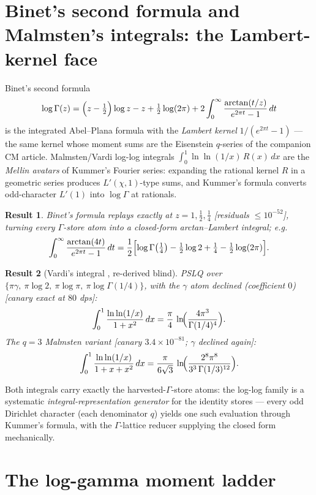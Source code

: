 \documentclass[11pt]{article}
\newtheorem{result}{Result}[section]
\theoremstyle{remark}
\newcommand{\dps}[1]{\textsf{\footnotesize[#1]}}
\begin{document}
\section{Binet's second formula and Malmsten's integrals: the Lambert-kernel face}
\label{sec:binet}

Binet's second formula
\[
\log\Gamma(z)=\Bigl(z-\tfrac12\Bigr)\log z-z+\tfrac12\log(2\pi)
+2\int_0^\infty\frac{\arctan(t/z)}{e^{2\pi t}-1}\,dt
\]
is the integrated Abel--Plana formula with the \emph{Lambert kernel} $1/(e^{2\pi t}-1)$ ---
the same kernel whose moment sums are the Eisenstein $q$-series of the companion CM
article. Malmsten/Vardi log-log integrals $\int_0^1\ln\ln(1/x)\,R(x)\,dx$ are the
\emph{Mellin avatars} of Kummer's Fourier series: expanding the rational kernel $R$ in a
geometric series produces $L'(\chi,1)$-type sums, and Kummer's formula converts
odd-character $L'(1)$ into $\log\Gamma$ at rationals.

\begin{result}\label{res:binet}
Binet's formula replays exactly at $z=1,\tfrac12,\tfrac14$ \dps{residuals $\le10^{-52}$},
turning every $\Gamma$-store atom into a closed-form arctan--Lambert integral; e.g.
\[
\int_0^\infty\frac{\arctan(4t)}{e^{2\pi t}-1}\,dt
=\frac{1}{2}\Bigl[\log\Gamma\bigl(\tfrac14\bigr)-\tfrac12\log2+\tfrac14
-\tfrac12\log(2\pi)\Bigr].
\]
\end{result}

\begin{result}[Vardi's integral \cite{Vardi}, re-derived blind]\label{res:vardi}
PSLQ over $\{\pi\gamma,\ \pi\log2,\ \pi\log\pi,\ \pi\log\Gamma(1/4)\}$, with the $\gamma$
atom \emph{declined} (coefficient $0$) \dps{canary exact at $80$ dps}:
\[
\int_0^1\frac{\ln\ln(1/x)}{1+x^2}\,dx=\frac{\pi}{4}\,
\ln\!\Bigl(\frac{4\pi^3}{\Gamma(1/4)^4}\Bigr).
\]
The $q=3$ Malmsten variant \dps{canary $3.4\times10^{-81}$; $\gamma$ declined again}:
\[
\int_0^1\frac{\ln\ln(1/x)}{1+x+x^2}\,dx
=\frac{\pi}{6\sqrt3}\,\ln\!\Bigl(\frac{2^8\pi^8}{3^3\,\Gamma(1/3)^{12}}\Bigr).
\]
\end{result}

Both integrals carry exactly the harvested-$\Gamma$-store atoms: the log-log family is a
systematic \emph{integral-representation generator} for the identity stores --- every odd
Dirichlet character (each denominator $q$) yields one such evaluation through Kummer's
formula, with the $\Gamma$-lattice reducer supplying the closed form mechanically.

\section{The log-gamma moment ladder}\label{sec:moments}
\end{document}
